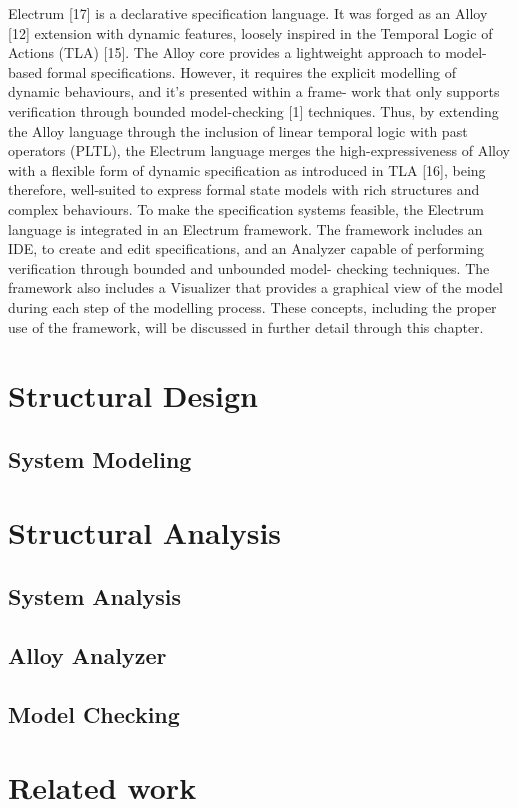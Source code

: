 Electrum [17] is a declarative specification language. It was forged as an Alloy [12] extension with dynamic features, loosely inspired in the Temporal Logic of Actions (TLA) [15]. The Alloy core provides a lightweight approach to model-based formal specifications. However, it requires the explicit modelling of dynamic behaviours, and it’s presented within a frame- work that only supports verification through bounded model-checking [1] techniques. Thus, by extending the Alloy language through the inclusion of linear temporal logic with past operators (PLTL), the Electrum language merges the high-expressiveness of Alloy with a flexible form of dynamic specification as introduced in TLA [16], being therefore, well-suited to express formal state models with rich structures and complex behaviours. To make the specification systems feasible, the Electrum language is integrated in an Electrum framework. The framework includes an IDE, to create and edit specifications, and an Analyzer capable of performing verification through bounded and unbounded model- checking techniques. The framework also includes a Visualizer that provides a graphical view of the model during each step of the modelling process. These concepts, including the proper use of the framework, will be discussed in further detail through this chapter.


\section{Structural Design}

\subsection{System Modeling}

\section{Structural Analysis}

\subsection{System Analysis}

\subsection{Alloy Analyzer}

\subsection{Model Checking}

\section{Related work}\label{s:alloy-relWork}
